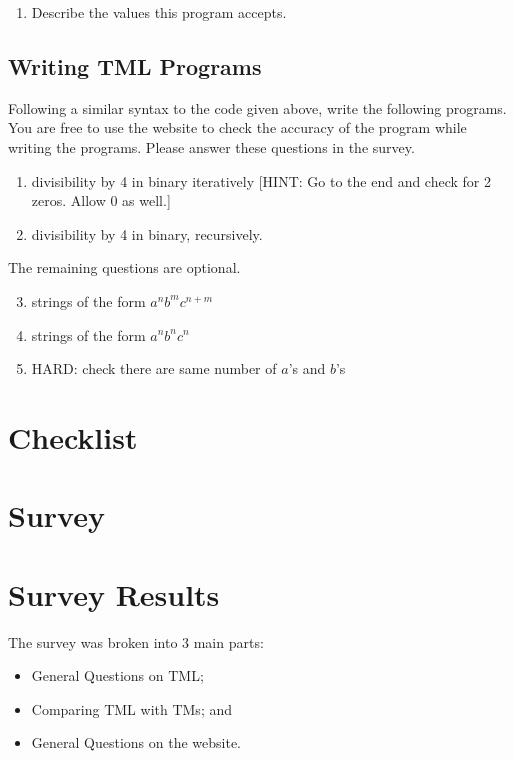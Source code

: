 \begin{appendices}
\begin{enumerate}
\begin{enumerate}
        \item Describe the values this program accepts.
    \end{enumerate}
\end{enumerate}
\newpage

\subsection{Writing TML Programs}

Following a similar syntax to the code given above, write the following programs. You are free to use the website to check the accuracy of the program while writing the programs. Please answer these questions in the survey.
\begin{enumerate}
    \item divisibility by 4 in binary iteratively [HINT: Go to the end and check for 2 zeros. Allow 0 as well.]
    \item divisibility by 4 in binary, recursively.
\end{enumerate}
    
The remaining questions are optional. 
\begin{enumerate}
    \setcounter{enumi}{2}
    \item strings of the form $a^n b^m c^{n+m}$
    \item strings of the form $a^n b^n c^n$
    \item HARD: check there are same number of $a$'s and $b$'s
\end{enumerate}

\section{Checklist}
\section{Survey}



\section{Survey Results}
The survey was broken into 3 main parts:
\begin{itemize}
    \item General Questions on TML;
    \item Comparing TML with TMs; and
    \item General Questions on the website.
\end{itemize}


\end{appendices}
